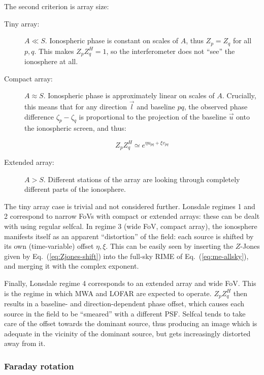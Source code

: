 \documentclass{aa}
\newcommand{\herm}{H}
\begin{document}
The second criterion is array size:

\begin{description}
\item[Tiny array:] $A\ll S$. Ionospheric phase is constant on scales of $A$, thus $Z_p=Z_q$ for all $p,q$. This makes $Z_p Z^\herm_q=1$, so the interferometer does not ``see'' the ionosphere at all.
\item[Compact array:] $A\approx S$. Ionospheric phase is approximately linear on scales of $A$. Crucially, this means that for any direction $\vec l$ and baseline $pq$, the observed phase difference $\zeta_p-\zeta_q$ is proportional to the projection of the baseline $\vec u$ onto the ionospheric screen, and thus:

\begin{equation}\label{eq:Zjones-shift}
Z_p Z^\herm_q \simeq e^{\eta u_{pq} + \xi v_{pq}}
\end{equation}

\item[Extended array:] $A>S$. Different stations of the array are looking through completely different parts of the ionosphere.
\end{description}

The tiny array case is trivial and not considered further. Lonsdale regimes 1 and 2 correspond to narrow FoVs with compact or extended arrays: these can be dealt with using regular selfcal. In regime 3 (wide FoV, compact array), the ionosphere manifests itself as an apparent ``distortion'' of the field: each source is shifted by its own (time-variable) offset $\eta,\xi$. This can be easily seen by inserting the $Z$-Jones given by Eq.~(\ref{eq:Zjones-shift}) into the full-sky RIME of Eq.~(\ref{eq:me-allsky}), and merging it with the complex exponent. 

Finally, Lonsdale regime 4 corresponds to an extended array and wide FoV. This is the regime in which MWA and LOFAR are expected to operate. $Z_p Z^\herm_q$ then results in a baseline- and direction-dependent phase offset, which causes each source in the field to be ``smeared'' with a different PSF. Selfcal tends to take care of the offset towards the dominant source, thus producing an image which is adequate in the vicinity of the dominant source, but gets increasingly distorted away from it. 


\subsubsection{Faraday rotation\label{sec:DFR}\label{sec:FR}}
\end{document}
